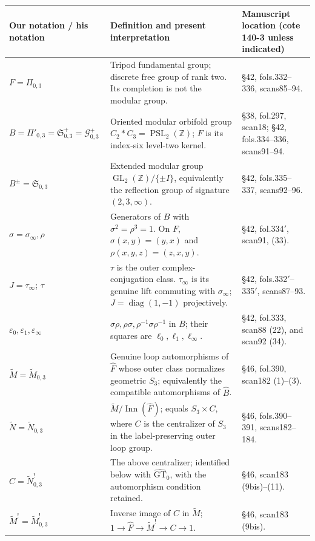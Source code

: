 \begin{longtable}{p{}p{}p{}}
\toprule
Our notation / his notation&Definition and present interpretation&Manuscript location (cote 140-3 unless indicated)\\\midrule\endhead
$F=\Pi_{0,3}$&Tripod fundamental group; discrete free group of rank two. Its completion is not the modular group.&\S42, fols.332--336, scans85--94.\\
$B=\Pi'_{0,3}=\mathfrak S^+_{0,3}=\mathcal G^+_{0,3}$&Oriented modular orbifold group $C_2*C_3=\operatorname{PSL}_2(\mathbb Z)$; $F$ is its index-six level-two kernel.&\S38, fol.297, scan18; \S42, fols.334--336, scans91--94.\\
$B^\pm=\mathfrak S_{0,3}$&Extended modular group $\operatorname{GL}_2(\mathbb Z)/\{\pm I\}$, equivalently the reflection group of signature $(2,3,\infty)$.&\S42, fols.335--337, scans92--96.\\
$\sigma=\sigma_\infty,\rho$&Generators of $B$ with $\sigma^2=\rho^3=1$. On $F$, $\sigma(x,y)=(y,x)$ and $\rho(x,y,z)=(z,x,y)$.&\S42, fol.334$'$, scan91, (33).\\
$J=\tau_\infty$; $\tau$&$\tau$ is the outer complex-conjugation class. $\tau_\infty$ is its genuine lift commuting with $\sigma_\infty$; $J=\operatorname{diag}(1,-1)$ projectively.&\S42, fols.332$'$--335$'$, scans87--93.\\
$\varepsilon_0,\varepsilon_1,\varepsilon_\infty$&$\sigma\rho,\rho\sigma,\rho^{-1}\sigma\rho^{-1}$ in $B$; their squares are $\ell_0,\ell_1,\ell_\infty$.&\S42, fol.333, scan88 (22), and scan92 (34).\\
$\widetilde M=\widetilde M_{0,3}$&Genuine loop automorphisms of $\widehat F$ whose outer class normalizes geometric $S_3$; equivalently the compatible automorphisms of $\widehat B$.&\S46, fol.390, scan182 (1)--(3).\\
$\widetilde N=\widetilde N_{0,3}$&$\widetilde M/\operatorname{Inn}(\widehat F)$; equals $S_3\times C$, where $C$ is the centralizer of $S_3$ in the label-preserving outer loop group.&\S46, fols.390--391, scans182--184.\\
$C=\widetilde N_{0,3}^{!}$&The above centralizer; identified below with $\widehat{\mathrm{GT}}_0$, with the automorphism condition retained.&\S46, scan183 (9bis)--(11).\\
$\widetilde M^!=\widetilde M_{0,3}^{!}$&Inverse image of $C$ in $\widetilde M$; $1\to\widehat F\to\widetilde M^!\to C\to1$.&\S46, scan183 (9bis).\\

\end{longtable}
